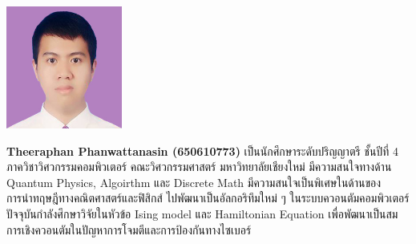 \documentclass[semifinal]{cpecmu}
\begin{document}
\begin{biosketch}
\begin{center}
  \includegraphics[width=1.5in]{0773.jpg}
\end{center}
\textbf{Theeraphan Phanwattanasin (650610773)} เป็นนักศึกษาระดับปริญญาตรี ชั้นปีที่ 4 ภาควิชาวิศวกรรมคอมพิวเตอร์ คณะวิศวกรรมศาสตร์ มหาวิทยาลัยเชียงใหม่ มีความสนใจทางด้าน Quantum Physics, Algoirthm และ Discrete Math มีความสนใจเป็นพิเศษในด้านของ การนำทฤษฎีทางคณิตศาสตร์และฟิสิกส์ ไปพัฒนาเป็นอัลกอริทึมใหม่ ๆ ในระบบควอนตัมคอมพิวเตอร์ ปัจจุบันกำลังศึกษาวิจัยในหัวข้อ Ising model และ Hamiltonian Equation เพื่อพัฒนาเป็นสมการเชิงควอนตัมในปัญหาการโจมตีและการป้องกันทางไซเบอร์
\end{biosketch}
\fi %
\end{document}
